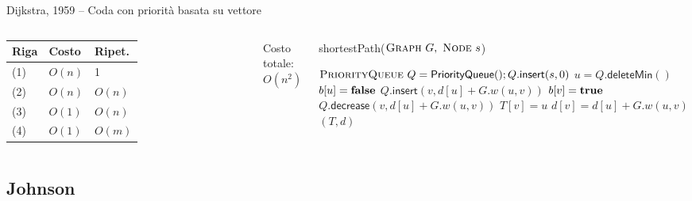 \begin{frame}{Dijkstra, 1959 -- Coda con priorità basata su vettore}



\vspace{-9pt}
\begin{columns}

\begin{tabular}{|l|l|l|}
\hline
Riga & Costo & Ripet. \\\hline
(1) & $O(n)$ & 1 \\\hline
(2) & $O(n)$ & $O(n)$ \\\hline
(3) & $O(1)$ & $O(n)$ \\\hline
(4) & $O(1)$ & $O(m)$ \\\hline
\end{tabular}

\medskip
Costo totale: \alert{$O(n^2)$}

\vspace{-12pt}
\tiny
\begin{Procedure}
\caption[A]{\textsf{shortestPath}($\textsc{Graph}\ G,\ \textsc{Node}\ s$)}
\alert{$\textsc{PriorityQueue}\ Q = \textsf{PriorityQueue}(); Q.\textsf{insert}(s, 0)$}\;
{
  \alert{$u = Q.\textsf{deleteMin}()$}\;
  $b[u] = \FALSE$\;
  {
    {
      {
        \alert{$Q.\textsf{insert}(v, d[u]+G.w(u,v))$}\;
        $b[v] = \TRUE$\;
      }
      {
        \alert{$Q.\textsf{decrease}(v, d[u]+G.w(u,v))$}
      }
      $T[v] = u$\;
      $d[v] = d[u] + G.w(u,v)$\;
    }
  }
}
\Return $(T,d)$
\end{Procedure}
\end{columns}



\end{frame}

\subsection{Johnson}

